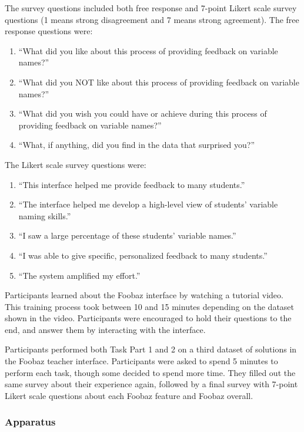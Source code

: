 The survey questions included both free response and 7-point Likert scale survey questions (1 means strong disagreement and 7 means strong agreement). The free response questions were:
\begin{enumerate} 
\item ``What did you like about this process of providing feedback on variable names?''
\item ``What did you NOT like about this process of providing feedback on variable names?'' 
\item ``What did you wish you could have or achieve during this process of providing feedback on variable names?'' 
\item ``What, if anything, did you find in the data that surprised you?''
\end{enumerate}
The Likert scale survey questions were:
\begin{enumerate}
\item ``This interface helped me provide feedback to many students.''
\item ``The interface helped me develop a high-level view of students' variable naming skills.''
\item ``I saw a large percentage of these students' variable names.''
\item ``I was able to give specific, personalized feedback to many students.''
\item ``The system amplified my effort.''
\end{enumerate}


Participants learned about the Foobaz interface by watching a tutorial video. This training process took between 10 and 15 minutes depending on the dataset shown in the video. Participants were encouraged to hold their questions to the end, and answer them by interacting with the interface. 

Participants performed both Task Part 1 and 2 on a third dataset of solutions in the Foobaz teacher interface. Participants were asked to spend 5 minutes to perform each task, though some decided to spend more time. They filled out the same survey about their experience again, followed by a final survey with 7-point Likert scale questions about each Foobaz feature and Foobaz overall.

\subsubsection{Apparatus}

